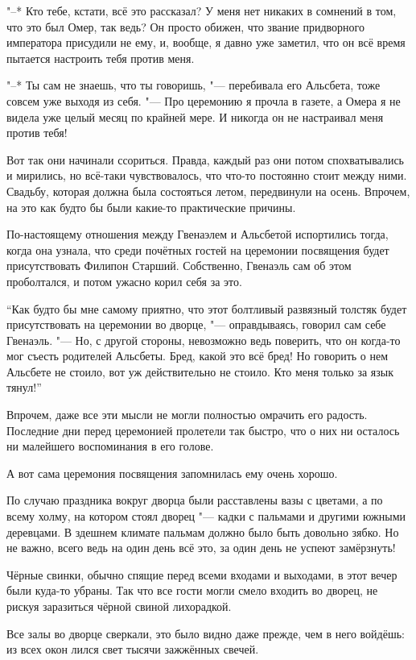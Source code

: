 "--* Кто тебе, кстати, всё это рассказал?
У меня нет никаких в сомнений в том, что это был Омер, так ведь?
Он просто обижен, что звание придворного императора присудили не ему, и, вообще,
я давно уже заметил, что он всё время пытается настроить тебя против меня.

"--* Ты сам не знаешь, что ты говоришь, "--- перебивала его Альсбета, тоже
совсем уже выходя из себя.
"--- Про церемонию я прочла в газете, а Омера я не видела уже целый месяц по
крайней мере.
И никогда он не настраивал меня против тебя!

Вот так они начинали ссориться.
Правда, каждый раз они потом спохватывались и мирились, но всё-таки
чувствовалось, что что-то постоянно стоит между ними.
Свадьбу, которая должна была состояться летом, передвинули на осень.
Впрочем, на это как будто бы были какие-то практические причины.

По-настоящему отношения между Гвенаэлем и Альсбетой испортились тогда, когда она
узнала, что среди почётных гостей на церемонии посвящения будет присутствовать
Филипон Старший.
Собственно, Гвенаэль сам об этом проболтался, и потом ужасно корил себя за это.

\enquote{Как будто бы мне самому приятно, что этот болтливый развязный толстяк
будет присутствовать на церемонии во дворце, "--- оправдываясь, говорил сам себе
Гвенаэль.
"--- Но, с другой стороны, невозможно ведь поверить, что он когда-то мог съесть
родителей Альсбеты.
Бред, какой это всё бред!
Но говорить о нем Альсбете не стоило, вот уж действительно не стоило.
Кто меня только за язык тянул!}

Впрочем, даже все эти мысли не могли полностью омрачить его радость.
Последние дни перед церемонией пролетели так быстро, что о них ни осталось ни
малейшего воспоминания в его голове.

А вот сама церемония посвящения запомнилась ему очень хорошо.

По случаю праздника вокруг дворца были расставлены вазы с цветами, а по всему
холму, на котором стоял дворец "--- кадки с пальмами и другими южными деревцами.
В здешнем климате пальмам должно было быть довольно зябко.
Но не важно, всего ведь на один день всё это, за один день не успеют замёрзнуть!

Чёрные свинки, обычно спящие перед всеми входами и выходами, в этот вечер были
куда-то убраны.
Так что все гости могли смело входить во дворец, не рискуя заразиться чёрной
свиной лихорадкой.

Все залы во дворце сверкали, это было видно даже прежде, чем в него войдёшь:
из всех окон лился свет тысячи зажжённых свечей.

